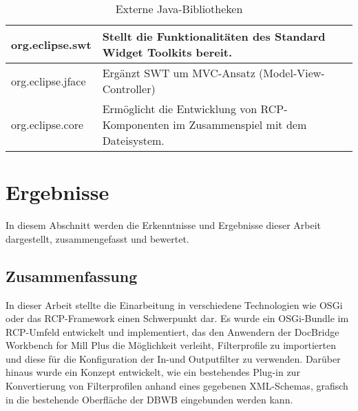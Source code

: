 {{{{{\begin{table}
\begin{tabular}{|l|l|}
    org.eclipse.swt                   & Stellt die Funktionalitäten des Standard Widget Toolkits bereit.                                                                                                     \\ \hline
    org.eclipse.jface                 & Ergänzt SWT um MVC-Ansatz (Model-View-Controller)                                                                                                                    \\ \hline
    org.eclipse.core                  & Ermöglicht die Entwicklung von RCP-Komponenten im Zusammenspiel mit dem Dateisystem.                                                                                 \\ \hline
    \end{tabular}
    \caption {Externe Java-Bibliotheken}
\end{table}


}



}


\section{Ergebnisse}{
\label{sec:ergebnisse}
In diesem Abschnitt werden die Erkenntnisse und Ergebnisse dieser Arbeit dargestellt, zusammengefasst und bewertet.

\subsection{Zusammenfassung}{
\label{sec:zusammenfassung}
In dieser Arbeit stellte die Einarbeitung in verschiedene Technologien wie \ac{OSGi} oder das \ac{RCP}-Framework einen Schwerpunkt dar. Es wurde ein \ac{OSGi}-Bundle im \ac{RCP}-Umfeld entwickelt und implementiert, das den Anwendern der DocBridge Workbench for Mill Plus die Möglichkeit verleiht, Filterprofile zu importierten und diese für die Konfiguration der In-und Outputfilter zu verwenden.
Darüber hinaus wurde ein Konzept entwickelt, wie ein bestehendes Plug-in zur Konvertierung von Filterprofilen anhand eines gegebenen XML-Schemas, grafisch in die bestehende Oberfläche der \ac{DBWB} eingebunden werden kann. 
}



}}}}
